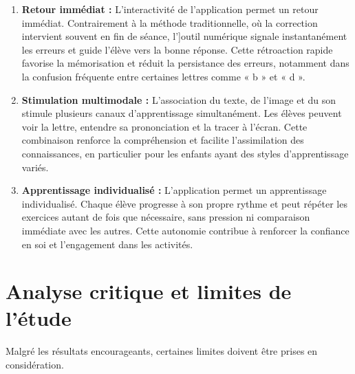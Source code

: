 \documentclass[a4paper,oneside,12pt]{book}
\begin{document}
\begin{enumerate}
	\item \textbf{Retour immédiat :} L'interactivité de l'application permet un retour immédiat. Contrairement à la méthode traditionnelle, où la correction intervient souvent en fin de séance, l']outil numérique signale instantanément les erreurs et guide l'élève vers la bonne réponse. Cette rétroaction rapide favorise la mémorisation et réduit la persistance des erreurs, notamment dans la confusion fréquente entre certaines lettres comme « b » et « d ».
	
	\item \textbf{Stimulation multimodale :} L'association du texte, de l'image et du son stimule plusieurs canaux d'apprentissage simultanément. Les élèves peuvent voir la lettre, entendre sa prononciation et la tracer à l'écran. Cette combinaison renforce la compréhension et facilite l'assimilation des connaissances, en particulier pour les enfants ayant des styles d'apprentissage variés.
	
	\item \textbf{Apprentissage individualisé :} L'application permet un apprentissage individualisé. Chaque élève progresse à son propre rythme et peut répéter les exercices autant de fois que nécessaire, sans pression ni comparaison immédiate avec les autres. Cette autonomie contribue à renforcer la confiance en soi et l'engagement dans les activités.
\end{enumerate}









\section{ Analyse critique et limites de l'étude}

Malgré les résultats encourageants, certaines limites doivent être prises en considération.
\end{document}
